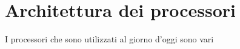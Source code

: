 \chapter{Architettura dei processori}
I processori che sono utilizzati al giorno d'oggi sono vari



